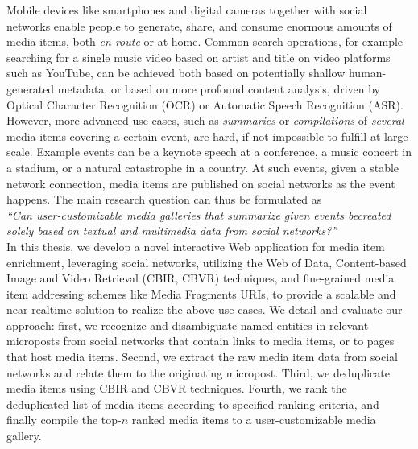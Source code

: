 


\begin{abstracts}        %
Mobile devices like smartphones and digital cameras together with social networks enable people to generate,
share, and consume enormous amounts of media items, both \textit{en route} or at home.
Common search operations, for example searching for a single music video based on artist
and title on video platforms such as YouTube,
can be achieved both based on potentially shallow human-generated metadata,
or based on more profound content analysis,
driven by Optical Character Recognition (OCR) or Automatic Speech Recognition (ASR).
However, more advanced use cases, such as \emph{summaries} or \emph{compilations} of \emph{several} media items
covering a certain event, are hard, if not impossible to fulfill at large scale.
Example events can be a keynote speech at a conference,
a music concert in a stadium, or a natural catastrophe in a country.
At such events, given a stable network connection,
media items are published on social networks as the event happens.
The main research question can thus be formulated as\\

\noindent \textit{``Can user-customizable media galleries that summarize given events
be\linebreak created solely based on textual and multimedia data from social networks?''}\\

In this thesis, we develop a novel interactive Web application for media item enrichment,
leveraging social networks, utilizing the Web of Data,
Content-based Image and Video Retrieval (CBIR, CBVR) techniques,
and fine-grained media item addressing schemes like Media Fragments URIs,
to provide a scalable and near realtime solution to realize the above use cases.
We detail and evaluate our approach:
first, we recognize and disambiguate named entities in relevant microposts
from social networks that contain links to media items, or to pages that host media items.
Second, we extract the raw media item data from social networks and relate them to the originating micropost.
Third, we deduplicate media items using CBIR and CBVR techniques.
Fourth, we rank the deduplicated list of media items according to specified ranking criteria,
and finally compile the top-$n$ ranked media items to a user-customizable media gallery.

\end{abstracts}


